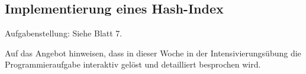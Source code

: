 \begin{solution}

\section{Implementierung eines Hash-Index}

Aufgabenstellung: Siehe Blatt 7.

\end{solution}


\lstset{basicstyle=\ttfamily,language=C}

\begin{note}
Auf das Angebot hinweisen, dass in dieser Woche in der Intensivierungsübung die Programmieraufgabe interaktiv gelöst und detailliert besprochen wird.

\end{note}

